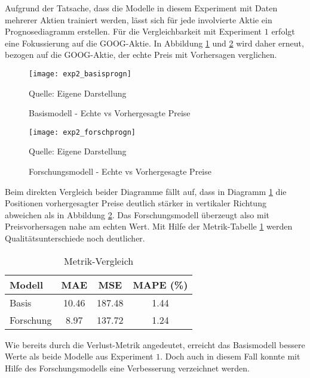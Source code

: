 Aufgrund der Tatsache, dass die Modelle in diesem Experiment mit Daten mehrerer Aktien trainiert werden, lässt sich für jede involvierte Aktie ein Prognosediagramm erstellen. Für die Vergleichbarkeit mit Experiment $1$ erfolgt eine Fokussierung auf die GOOG-Aktie.
In Abbildung \ref{fig:exp2_basisprogn} und \ref{fig:exp2_forschprogn} wird daher erneut, bezogen auf die GOOG-Aktie, der echte Preis mit Vorhersagen verglichen.
\begin{figure}[H]
	\caption{Basismodell - Echte vs Vorhergesagte Preise}
	\texttt{[image: exp2\_basisprogn]}
	\label{fig:exp2_basisprogn}
	\raggedright
	\normalsize{Quelle: Eigene Darstellung}
	\vspace{-1.0em}
\end{figure}
\begin{figure}[H]
	\caption{Forschungsmodell - Echte vs Vorhergesagte Preise}
	\texttt{[image: exp2\_forschprogn]}
	\label{fig:exp2_forschprogn}
	\raggedright
	\normalsize{Quelle: Eigene Darstellung}
	\vspace{-1.0em}
\end{figure}
Beim direkten Vergleich beider Diagramme fällt auf, dass in Diagramm \ref{fig:exp2_basisprogn} die Positionen vorhergesagter Preise deutlich stärker in vertikaler Richtung abweichen als in Abbildung \ref{fig:exp2_forschprogn}. Das Forschungsmodell überzeugt also mit Preisvorhersagen nahe am echten Wert.
Mit Hilfe der Metrik-Tabelle \ref{tbl:exp2_model_metrics} werden Qualitätsunterschiede noch deutlicher.
\begin{table}[H]
	\centering
	\caption{Metrik-Vergleich}
	\label{tbl:exp2_model_metrics}
	\begin{tabular}{lccc}
		\hline
		\textbf{Modell} & \textbf{MAE} & \textbf{MSE} & \textbf{MAPE (\%)} \\
		\hline
		Basis & 10.46 & 187.48 & 1.44 \\
		Forschung & 8.97 & 137.72 & 1.24 \\
		\hline
	\end{tabular}
\end{table}
Wie bereits durch die Verlust-Metrik angedeutet, erreicht das Basismodell bessere Werte als beide Modelle aus Experiment $1$. Doch auch in diesem Fall konnte mit Hilfe des Forschungsmodells eine Verbesserung verzeichnet werden.

